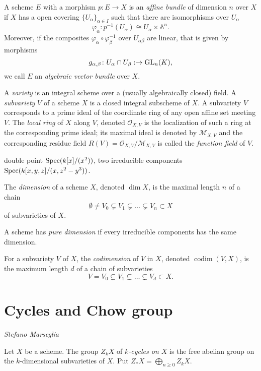 \documentclass[a4paper,openany]{scrbook}
\DeclareMathOperator{\codim}{codim}
\newcommand{\chapterauthor}[1]{\hfill\emph{#1}\par\noindent}
\begin{document}
\begin{defn}
 A scheme $E$ with a morphism $p\colon E\to X$ is an \emph{affine bundle} of dimension $n$ over $X$ if $X$ has a open covering $\{U_\alpha\}_{\alpha \in I}$ such that there are isomorphisms over $U_\alpha$
 \[\varphi_\alpha\colon p^{-1}(U_\alpha) \cong U_\alpha\times \mathbb A^n.\]
 Moreover, if  the composites $\varphi_\alpha\circ \varphi_\beta^{-1}$ over $U_{\alpha\beta}$ are linear, that is given by morphisms
 \[
 g_{\alpha,\beta}\colon U_\alpha\cap U_\beta:\to \operatorname{GL}_n(K),
 \]
 we call $E$ an \emph{algebraic vector bundle} over $X$.
\end{defn}

A \emph{variety} is an integral scheme over a (usually algebraically closed) field. A \emph{subvariety} $V$ of a scheme $X$ is a closed integral subscheme of $X$. A subvariety $V$ corresponds to a prime ideal of the coordinate ring of any open affine set meeting $V$. The \emph{local ring} of $X$ along $V$, denoted $\mathcal O_{X,V}$ is the localization of such a ring at the corresponding prime ideal; its maximal ideal is denoted by $\mathcal M_{X,V}$ and the corresponding residue field $R(V)=\mathcal O_{X,V}/\mathcal M_{X,V}$ is called the \emph{function field} of $V$. 

\begin{example} 
double point $\operatorname{Spec}(k[x]/(x^2))$, two irreducible components $\operatorname{Spec}(k[x,y,z]/(x,z^2-y^3))$.
\end{example}

\begin{defn}
The \emph{dimension} of a scheme $X$, denoted $\dim X$, is the maximal length $n$ of a chain
\[
\emptyset \neq V_0 \subsetneq V_1\subsetneq \ldots \subsetneq V_n\subset X
\]
of subvarieties of $X$.

A scheme has \emph{pure dimension} if every irreducible components has the same dimension.

For a subvariety $V$ of $X$, the \emph{codimension} of $V$ in $X$, denoted $\codim(V,X)$, is the maximum length $d$ of a chain of subvarieties
\[
V=V_0\subsetneq V_1\subsetneq \ldots \subsetneq V_d\subset X.
\]
\end{defn}

\section{Cycles and Chow group}
\chapterauthor{Stefano Marseglia}

Let $X$ be a scheme. The group $Z_kX$ of \emph{$k$-cycles on $X$} is the free abelian group on the $k$-dimensional subvarieties of $X$. Put $Z_*X=\bigoplus_{n\geq 0} Z_kX$.
\end{document}
